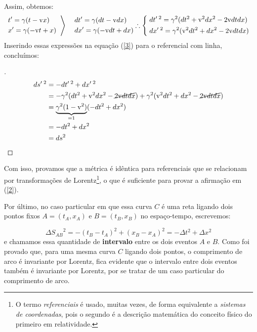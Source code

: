 \documentclass[12pt,a4paper]{article}
\begin{document}
Assim, obtemos:
\[
  \left.
  \begin{aligned}
    &   t' = \gamma(t - \mathrm{v}x) \\
    &   x' = \gamma(-\mathrm{v}t + x) 
  \end{aligned}\;\;
  \right\rangle\;\;\;\;
  \begin{aligned}
    & dt' = \gamma(dt - \mathrm{v}dx)\\
    & dx' = \gamma(-\mathrm{v}dt +dx)
  \end{aligned}\\\\
  \therefore 
  \left\{\;
  \begin{aligned}
    & dt^{\prime\;2} = \gamma^2(dt^2 + \mathrm{v}^2dx^2 - 2\mathrm{v}dtdx)\\
    & dx^{\prime\;2} = \gamma^2(\mathrm{v}^2dt^2 + dx^2 - 2\mathrm{v}dtdx)
  \end{aligned}\right.
\]
Inserindo essas expressões na equação (\ref{3}) para o referencial com linha, concluímos:
\begin{proof}[]
  \begin{align}
    ds^{\prime\; 2} &= -dt^{\prime\; 2} + dx^{\prime\; 2} \nonumber \\
    &= -\gamma^2(dt^2 + \mathrm{v}^2dx^2 - \cancel{2\mathrm{v}dtdx}) + \gamma^2(\mathrm{v}^2dt^2 + dx^2 - \cancel{2\mathrm{v}dtdx}) \nonumber \\
    &=  \underbrace{\gamma^2 (1-\mathrm{v}^2)}_{= 1}(-dt^2 + dx^2) \nonumber\\
    &= -dt^2 + dx^2 \nonumber \\
    &= ds^2 \qedhere
  \end{align}
\end{proof}
Com isso, provamos que a métrica é idêntica para referenciais que se relacionam por transformações de
Lorentz\footnote{O termo \textit{referenciais} é usado, muitas vezes, de forma equivalente a \textit{sistemas de coordenadas}, pois o segundo é a descrição matemática do conceito físico do primeiro em relatividade.},
o que é suficiente para provar a afirmação em (\ref{2}).

Por último, no caso particular em que essa curva $C$ é uma reta ligando dois pontos fixos $A = (t_A,x_A)$ e $B=(t_B,x_B)$ no espaço-tempo,
escrevemos:

\begin{equation}
  {\Delta S_{AB}}^2 = -(t_B - t_A)^2 + (x_B - x_A)^2 = -\Delta t^2 + \Delta x^2
\end{equation}
e chamamos essa quantidade de \textbf{intervalo} entre os dois eventos $A$ e $B$. Como foi provado que, para uma mesma curva
$C$ ligando dois pontos, o comprimento de arco é invariante por Lorentz, fica evidente que o intervalo entre
dois eventos também é invariante por Lorentz, por se tratar de um caso particular do comprimento de arco.
\end{document}
